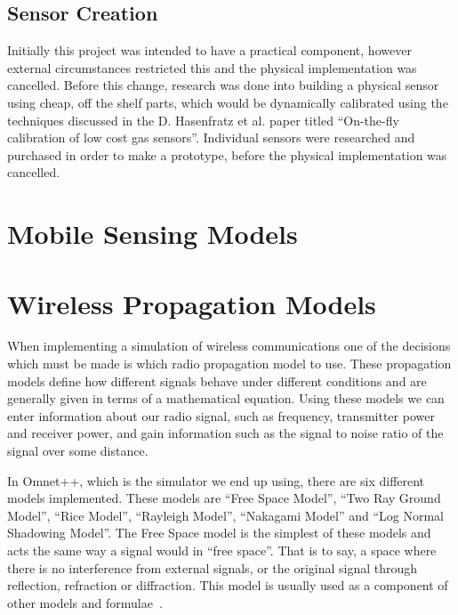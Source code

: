     \subsection{Sensor Creation}

        Initially this project was intended to have a practical component, however external circumstances restricted this and the physical implementation was cancelled. Before this change, research was done into building a physical sensor using cheap, off the shelf parts, which would be dynamically calibrated using the techniques discussed in the D. Hasenfratz et al. paper titled ``On-the-fly calibration of low cost gas sensors''\cite{ontheflycalibration}. Individual sensors were researched and purchased in order to make a prototype, before the physical implementation was cancelled. 
    



\section{Mobile Sensing Models}\label{background_mobile_sensing_models}



\section{Wireless Propagation Models}


    When implementing a simulation of wireless communications one of the decisions which must be made is which radio propagation model to use. These propagation models define how different signals behave under different conditions and are generally given in terms of a mathematical equation. Using these models we can enter information about our radio signal, such as frequency, transmitter power and receiver power,  and gain information such as the signal to noise ratio of the signal over some distance.

    In Omnet++, which is the simulator we end up using, there are six different models implemented. These models are ``Free Space Model'', ``Two Ray Ground Model'', ``Rice Model'', ``Rayleigh Model'', ``Nakagami Model'' and ``Log Normal Shadowing Model''. The Free Space model is the simplest of these models and acts the same way a signal would in ``free space''. That is to say, a space where there is no interference from external signals, or the original signal through reflection, refraction or diffraction. This model is usually used as a component of other models and formulae~\cite{friis1946note}.

